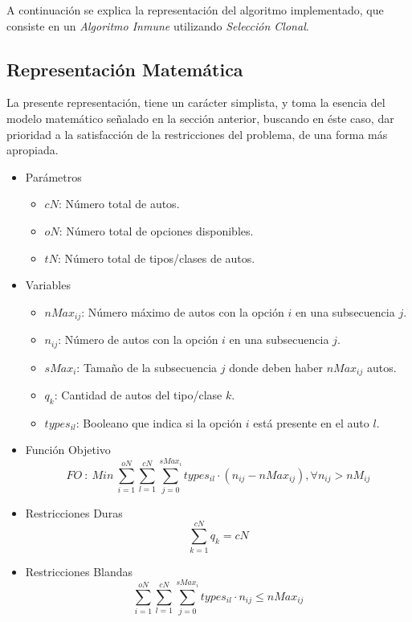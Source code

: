 
A continuación se explica la representación del algoritmo implementado,
que consiste en un \emph{Algoritmo Inmune} utilizando \emph{Selección Clonal}.

\subsection{Representación Matemática}

La presente representación, tiene un carácter simplista, y toma la esencia del modelo
matemático señalado en la sección anterior, buscando en éste caso, dar prioridad a la satisfacción
de la restricciones del problema, de una forma más apropiada.

\begin{itemize}
	\item Parámetros
	\begin{itemize}
		\item $cN$: Número total de autos.
		\item $oN$: Número total de opciones disponibles.
		\item $tN$: Número total de tipos/clases de autos.
	\end{itemize}
	\item Variables
	\begin{itemize}
		\item $nMax_{ij}$: Número máximo de autos con la opción $i$ en una subsecuencia $j$.
		\item $n_{ij}$: Número de autos con la opción $i$ en una subsecuencia $j$.
		\item $sMax_{i}$: Tamaño de la subsecuencia $j$ donde deben haber $nMax_{ij}$ autos.
		\item $q_{k}$: Cantidad de autos del tipo/clase $k$.
		\item $types_{il}$: Booleano que indica si la opción $i$ está presente en el auto $l$.
	\end{itemize}
	\item Función Objetivo
	$$FO\ :\ Min\ \sum\limits_{i=1}^{oN} \sum\limits_{l=1}^{cN} \sum\limits_{j=0}^{sMax_{i}} types_{il}\cdot (n_{ij} - nMax_{ij}), \forall n_{ij} > nM_{ij}$$
	\item Restricciones Duras
	$$\sum\limits_{k=1}^{cN} q_{k} = cN$$
	\item Restricciones Blandas
	$$\sum\limits_{i=1}^{oN} \sum\limits_{l=1}^{cN} \sum\limits_{j=0}^{sMax_{i}} types_{il}\cdot n_{ij} \leq nMax_{ij}$$
\end{itemize}
